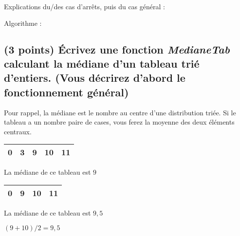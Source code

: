 \documentclass[11pt,a4paper]{article}
\begin{document}
\bigskip

\begin{center}
Explications du/des cas d'arrêts, puis du cas général :

\bigskip

Algorithme :
\end{center}




\subsection{(3 points) \'Ecrivez une fonction \og \textit{MedianeTab} \fg{} calculant la médiane d'un tableau trié d'entiers. (Vous décrirez d'abord le fonctionnement général) }


\noindent Pour rappel, la médiane est le nombre au centre d'une distribution triée. Si le tableau a un nombre paire de cases, vous ferez la moyenne des deux éléments centraux.


\begin{table}[h!]
  \centering
  \begin{minipage}{0.4\textwidth}
    \centering
    \begin{tabular}{| c | c | c | c | c |}
      \hline
      0 & 3 & 9 & 10 & 11 \\
      \hline
    \end{tabular}

  \smallskip

  La médiane de ce tableau est $ 9 $
  \end{minipage}
    \hfillx
    \begin{minipage}{0.4\textwidth}
    \centering
    \begin{tabular}{| c | c | c | c |}
      \hline
      0 & 9 & 10 & 11 \\
      \hline
    \end{tabular}

  \smallskip

  La médiane de ce tableau est $ 9,5 $

  $ (9 + 10) / 2 = 9,5 $
  \end{minipage}
\end{table}
\end{document}
